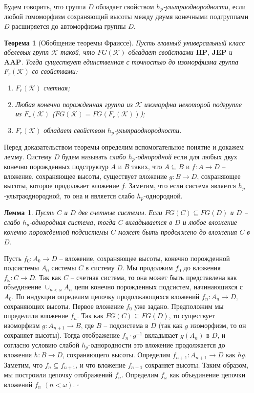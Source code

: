 \documentclass[12pt]{extarticle} %
\newtheorem{theorem}{Теорема}[section]
\newtheorem{lemma}{Лемма}[section]
\def\proof{{\noindent{\bf Доказательство.}} }
\def\K{{\mathcal{K}}}
\def\HP{\textbf{HP}}
\def\JEP{\textbf{JEP}}
\def\AAP{\textbf{AAP}}
\begin{document}
Будем говорить, что группа $D$ обладает свойством \textit{$h_p$-ультраоднородности}, если любой гомоморфизм сохраняющий высоты между двумя конечными подгруппами $D$ расширяется до автоморфизма группы $D$.

\begin{theorem}[Обобщение теоремы Фраиссе]\label{th:Fraisse}
Пусть главный универсальный класс абелевых групп $\K$ такой, что $FG(\K)$ обладает свойствами $\HP$, $\JEP$ и $\AAP$. Тогда существует единственная с точностью до изоморфизма группа $F_r(\K)$ со свойствами:
\begin{enumerate}
\item $F_r(\K)$ счетная;
\item Любая конечно порожденная группа из $\K$ изоморфна некоторой подгруппе из $F_r(\K)$ ($FG(\K) = FG(F_r(\K))$);
\item $F_r(\K)$ обладает свойством $h_p$-ультраоднородности.
\end{enumerate}
\end{theorem}

Перед доказательством теоремы определим вспомогательное понятие и докажем лемму. Систему $D$ будем называть \textit{слабо $h_p$-однородной} если для любых двух конечно порожденных подструктур $A$ и $B$ таких, что $A \subseteq B$ и $f: A \rightarrow D$ -- вложение, сохраняющее высоты, существует вложение $g: B \rightarrow D$, сохраняющее высоты, которое продолжает вложение $f$. Заметим, что если система является $h_p$-ультраоднородной, то она и является слабо $h_p$-однородной.

\begin{lemma}\label{lemma:WeaklyHomogeneouseEmbeding}
Пусть $C$ и $D$ две счетные системы. Если $FG(C) \subseteq FG(D)$ и $D$ -- слабо $h_p$-однородная система, тогда $C$ вкладывается в $D$ и любое вложение конечно порожденной подсистемы $C$ может быть продолжено до вложения $C$ в $D$.
\end{lemma}

\proof Пусть $f_0: A_0 \rightarrow D$ -- вложение, сохраняющее высоты, конечно порожденной подсистемы $A_0$ системы $C$ в систему $D$. Мы продолжим $f_0$ до вложения $f_\omega: C \rightarrow D$. Так как $C$ -- счетная система, то она может быть представлена как объединение $\cup_{n < \omega} A_n$ цепи конечно порожденных подсистем, начинающихся с $A_0$. По индукции определим цепочку продолжающихся вложений $f_n: A_n \rightarrow D$, сохраняющих высоты. Первое вложение $f_0$ уже задано. Предположим мы определили вложение $f_n$. Так как $FG(C) \subseteq FG(D)$, то существует изоморфизм $g: A_{n+1} \rightarrow B$, где $B$ -- подсистема в $D$ (так как $g$ изоморфизм, то он сохраняет высоты). Тогда отображение $f_n \cdot g^{-1}$ вкладывает $g(A_n)$ в $D$, и согласно условию слабой $h_p$-однородности это вложение продолжается до вложения $h: B \rightarrow D$, сохраняющего высоты. Определим $f_{n+1}: A_{n+1} \rightarrow D$ как $hg$. Заметим, что $f_n \subseteq f_{n+1}$, и что вложение $f_{n+1}$ сохраняет высоты. Таким образом, мы построили цепочку отображений $f_n$. Определим $f_\omega$ как объединение цепочки вложений $f_n$ $(n < \omega)$. $\square$
\end{document}
